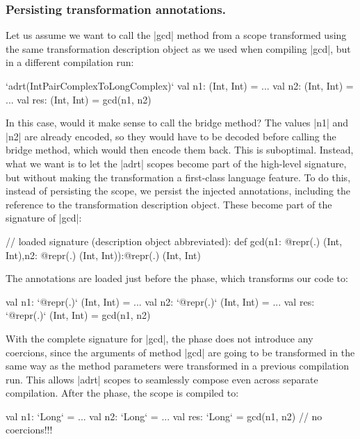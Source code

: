 \subsubsection{Persisting transformation annotations.} Let us assume we want to call the |gcd| method from a scope transformed using the same transformation description object as we used when compiling |gcd|, but in a different compilation run:

\begin{lstlisting-nobreak}
`adrt(IntPairComplexToLongComplex)` {
  val n1: (Int, Int) = ...
  val n2: (Int, Int) = ...
  val res: (Int, Int) = gcd(n1, n2)
}
\end{lstlisting-nobreak}

In this case, would it make sense to call the bridge method? The values |n1| and |n2| are already encoded, so they would have to be decoded before calling the bridge method, which would then encode them back. This is suboptimal. Instead, what we want is to let the |adrt| scopes become part of the high-level signature, but without making the transformation a first-class language feature. To do this, instead of persisting the scope, we persist the injected annotations, including the reference to the transformation description object. These become part of the signature of |gcd|: %

\begin{lstlisting-nobreak}
// loaded signature (description object abbreviated):
def gcd(n1: @repr(.) (Int, Int),n2: @repr(.) (Int, Int)):@repr(.) (Int, Int)
\end{lstlisting-nobreak}

The annotations are loaded just before the \inject{} phase, which transforms our code to:

\begin{lstlisting-nobreak}
val n1: `@repr(.)` (Int, Int) = ...
val n2: `@repr(.)` (Int, Int) = ...
val res: `@repr(.)` (Int, Int) = gcd(n1, n2)
\end{lstlisting-nobreak}

With the complete signature for |gcd|, the \coerce{} phase does not introduce any coercions, since the arguments of method |gcd| are going to be transformed in the same way as the method parameters were transformed in a previous compilation run. This allows |adrt| scopes to seamlessly compose even across separate compilation. After the \commit{} phase, the scope is compiled to:

\begin{lstlisting-nobreak}
val n1: `Long` = ...
val n2: `Long` = ...
val res: `Long` = gcd(n1, n2) // no coercions!!!
\end{lstlisting-nobreak}

